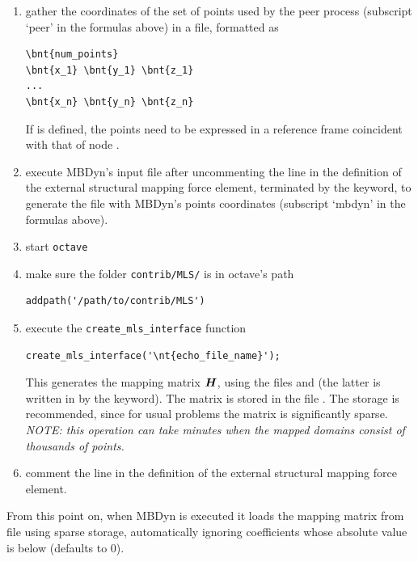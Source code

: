 \begin{enumerate}
\item gather the coordinates of the set of points used by the peer process
(subscript `peer' in the formulas above) in a file, formatted as
\begin{Verbatim}[commandchars=\\\{\}]
\bnt{num_points}
\bnt{x_1} \bnt{y_1} \bnt{z_1}
...
\bnt{x_n} \bnt{y_n} \bnt{z_n}
\end{Verbatim}
If  is defined, the points need to be expressed
in a reference frame coincident with that of node .

\item execute MBDyn's input file after uncommenting the  line
in the definition of the external structural mapping force element,
terminated by the  keyword, to generate the 
file with MBDyn's points coordinates (subscript `mbdyn' in the formulas above).

\item start \texttt{octave}

\item make sure the folder \texttt{contrib/MLS/} is in octave's path
\begin{Verbatim}[commandchars=\\\{\}]
    addpath('/path/to/contrib/MLS')
\end{Verbatim}

\item execute the \texttt{create\_mls\_interface} function
\begin{Verbatim}[commandchars=\\\{\}]
    create_mls_interface('\nt{echo_file_name}');
\end{Verbatim}
This generates the mapping matrix $\boldsymbol{H}$, using the files 
and  (the latter is written in 
by the  keyword). The matrix is stored in the file .
The  storage is recommended, since for usual problems
the matrix is significantly sparse.
\\
\emph{NOTE: this operation can take minutes when the mapped domains consist
of thousands of points.}

\item comment the  line
in the definition of the external structural mapping force element.
\end{enumerate}
From this point on, when MBDyn is executed it loads the mapping matrix
from file  using sparse storage, automatically
ignoring coefficients whose absolute value is below 
(defaults to 0).

